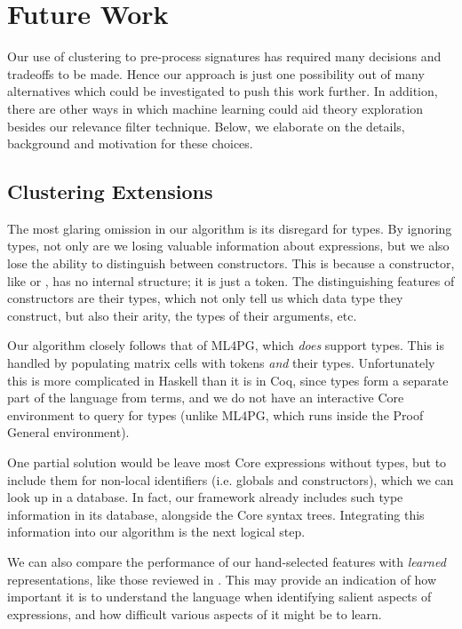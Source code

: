 \section{Future Work}
\label{sec:future}

Our use of clustering to pre-process \quickspec{} signatures has required many
decisions and tradeoffs to be made. Hence our approach is just one possibility
out of many alternatives which could be investigated to push this work
further. In addition, there are other ways in which machine learning could aid
theory exploration besides our relevance filter technique. Below, we elaborate
on the details, background and motivation for these choices.

\subsection{Clustering Extensions}
\label{sec:preprocessing}

The most glaring omission in our algorithm is its disregard for types. By
ignoring types, not only are we losing valuable information about expressions,
but we also lose the ability to distinguish between constructors. This is
because a constructor, like  or , has no internal structure;
it is just a token. The distinguishing features of constructors are their types,
which not only tell us which data type they construct, but also their arity, the
types of their arguments, etc.

Our algorithm closely follows that of ML4PG, which \emph{does} support
types. This is handled by populating matrix cells with tokens \emph{and} their
types. Unfortunately this is more complicated in Haskell than it is in Coq,
since types form a separate part of the language from terms, and we do not have
an interactive Core environment to query for types (unlike ML4PG, which runs
inside the Proof General environment).

One partial solution would be leave most Core expressions without types, but to
include them for non-local identifiers (i.e. globals and constructors), which we
can look up in a database. In fact, our \mlforhs{} framework already includes such
type information in its database, alongside the Core syntax trees. Integrating
this information into our algorithm is the next logical step.

We can also compare the performance of our hand-selected features with
\emph{learned} representations, like those reviewed in
\cite{bengio2013representation}. This may provide an indication of how
important it is to understand the language when identifying salient aspects of
expressions, and how difficult various aspects of it might be to learn.

